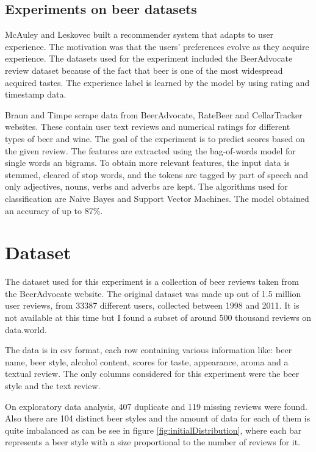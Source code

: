\documentclass[12pt]{article}
\begin{document}
	\subsection{Experiments on beer datasets}
	McAuley and Leskovec\cite{ExperienceReview} built a recommender system that adapts to user experience. The motivation was that the users' preferences evolve as they acquire experience. The datasets used for the experiment included the BeerAdvocate review dataset\cite{BeerAdvocateData} because of the fact that beer is one of the most widespread acquired tastes. The experience label is learned by the model by using rating and timestamp data.
	
	Braun and Timpe\cite{BeerWineReviews} scrape data from BeerAdvocate, RateBeer and CellarTracker websites. These contain user text reviews and numerical ratings for different types of beer and wine. The goal of the experiment is to predict scores based on the given review. The features are extracted using the bag-of-words model for single words an bigrams. To obtain more relevant features, the input data is stemmed, cleared of stop words, and the tokens are tagged by part of speech and only adjectives, nouns, verbs and adverbs are kept. The algorithms used for classification are Naive Bayes and Support Vector Machines. The model obtained an accuracy of up to 87\%.
	
	\section{Dataset}
	The dataset used for this experiment is a collection of beer reviews taken from the BeerAdvocate website. The original dataset was made up out of 1.5 million user reviews, from 33387 different users, collected between 1998 and 2011. It is not available at this time but I found a subset of around 500 thousand reviews on data.world\cite{BeerAdvocateData}. 
	
	The data is in csv format, each row containing various information like: beer name, beer style, alcohol content, scores for taste, appearance, aroma and a textual review. The only columns considered for this experiment were the beer style and the text review.
	
	On exploratory data analysis, 407 duplicate and 119 missing reviews were found. Also there are 104 distinct beer styles and the amount of data for each of them is quite imbalanced as can be see in figure \ref{fig:initialDistribution}, where each bar represents a beer style with a size proportional to the number of reviews for it.
	
\end{document}
